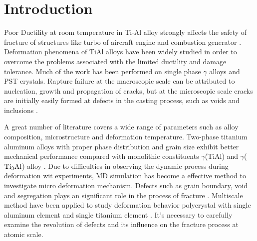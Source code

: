 \documentclass[metals,article,submit,moreauthors,pdftex,10pt,a4paper]{Definitions/mdpi}
\begin{document}
\section{Introduction}
Poor Ductility at room temperature in Ti-Al alloy strongly affects the safety of fracture of structures like turbo of aircraft engine and combustion generator \cite{Munz2017}. Deformation phenomena of TiAl alloys have been widely studied in order to overcome the problems associated with the limited ductility and damage tolerance.  Much of the work has been performed on single phase $\gamma$ alloys and PST crystals\cite{Appel2016}. Rapture failure at the macroscopic scale can be attributed to nucleation, growth and propagation of cracks, but at the microscopic scale cracks are initially easily formed at defects in the casting process, such as voids and inclusions \cite{Tang2014}. 

A great number of literature covers a wide range of parameters such as alloy composition, microstructure and deformation temperature. Two-phase titanium aluminum alloys with proper phase distribution and grain size exhibit better mechanical performance compared with monolithic constituents $\gamma$(TiAl) and $\gamma$($\rm Ti_3Al$) alloy \cite{Kim1995}. Due to difficulties in observing the dynamic process during deformation wit experiments, MD simulation has become a effective method to investigate micro deformation mechanism. Defects such as grain boundary, void and segregation plays an significant role in the process of fracture \cite{Larsen2016}. Multiscale method have been applied to study deformation behavior polycrystal with single aluminum element \cite{Groh2009} and single titanium element \cite{Liu2018}. It's necessary to carefully examine the revolution of defects and its influence on the fracture process at atomic scale. 
\end{document}
